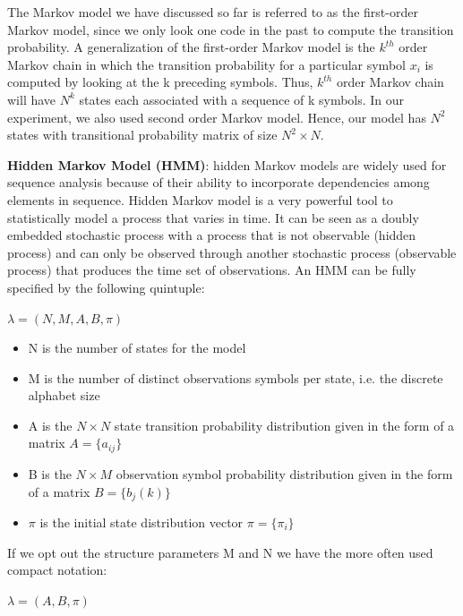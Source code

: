 \documentclass{amia}
\begin{document}
The Markov model we have discussed so far is referred to as the first-order Markov model, since we only look one code in the past to compute the transition probability. A generalization of the first-order Markov model is the $k^{th}$ order Markov chain in which the transition probability for a particular symbol $x_i$ is computed by looking at the k preceding symbols. Thus, $k^{th}$ order Markov chain will have $N^{k}$ states each associated with a sequence of k symbols. In our experiment, we also used second order Markov model. Hence, our model has $N^2$ states with transitional probability matrix of size $N^2 \times N$.  

\textbf {Hidden Markov Model (HMM)}: hidden Markov models are widely used for sequence analysis because of their ability to incorporate dependencies among elements in sequence. Hidden Markov model is a very
powerful tool to statistically model a process that varies in time. It can be seen as a doubly embedded stochastic process with a process that is not observable (hidden process) and can only be observed through another stochastic process (observable process) that produces the time set of observations. An HMM can be fully specified by the following quintuple:

\begin{center}
$\lambda = (N, M, A, B, \pi)$
\end{center}

\begin{itemize}
\item N is the number of states for the model
\item M is the number of distinct observations symbols per state, i.e. the discrete alphabet size
\item A is the $N\times N$ state transition probability distribution given in the form of a matrix $A = \{a_{ij}\}$
\item B is the $N\times M$ observation symbol probability distribution given in the form of a matrix $B = \{b_j(k)\}$
\item $\pi$ is the initial state distribution vector $\pi = \{\pi_i\}$
\end{itemize}

If we opt out the structure parameters M and N we have the more often used compact notation:

\begin{center}
$\lambda = (A, B, \pi)$
\end{center} 
\end{document}
